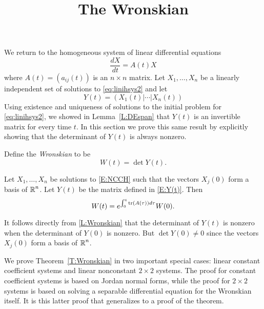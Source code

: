 \documentclass{ximera}
\title{The Wronskian}
\begin{document}
\begin{abstract}
\end{abstract}
\maketitle

  \label{S:wronskian}

We return to the homogeneous system of linear differential equations
\arraystart
\begin{equation}  \label{eq:linihsys2}
\frac{dX}{dt}  =  A(t)X
\end{equation}
\arrayfinish
where $A(t)=(a_{ij}(t))$ is an $n\times n$ matrix.  Let $X_1,\ldots,X_n$ be a 
linearly independent set of solutions 
to \eqref{eq:linihsys2} and let 
\begin{equation}   \label{E:Y(t)2}
Y(t) = \left(X_1(t)|\cdots |X_n(t)\right) 
\end{equation}
Using existence and uniqueness of solutions to the initial problem for
\eqref{eq:linihsys2}, we showed in Lemma~\ref{L:DEspan} that $Y(t)$ is an 
invertible matrix for every time $t$.  In this section we prove this same 
result by explicitly showing that the determinant 
of $Y(t)$ is always nonzero.

Define the {\em Wronskian\/} to be
\[
W(t) = \det Y(t).
\]

\begin{theorem}  \label{T:Wronskian}
Let $X_1,\ldots,X_n$ be solutions to \eqref{E:NCCH} such that the vectors
$X_j(0)$ form a basis of $\mbox{$\Bbb{R}$}^n$.  Let $Y(t)$ be the matrix defined in 
\eqref{E:Y(t)}.  Then
\begin{equation}  \label{L:Wronskian}
W(t) = e^{\int_0^t{\rm tr}(A(\tau))d\tau}W(0).
\end{equation}
\end{theorem}

It follows directly from \eqref{L:Wronskian} that the determinant of $Y(t)$ is 
nonzero when the determinant of $Y(0)$ is nonzero.  But $\det Y(0)\neq 0$ 
since the vectors $X_j(0)$ form a basis of $\mbox{$\Bbb{R}$}^n$. 

We prove Theorem~\ref{T:Wronskian} in two important special cases: linear 
constant coefficient systems and linear nonconstant $2\times 2$ systems.  
The proof for constant coefficient systems is based on Jordan normal forms, 
while the proof for $2\times 2$ systems is based on solving a separable 
differential equation for the Wronskian itself.  It is this latter proof 
that generalizes to a proof of the theorem.
\end{document}
